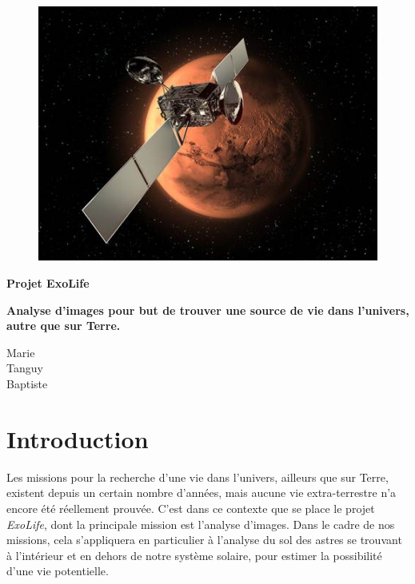 \documentclass[12pt]{article}
\begin{document}
\begin{figure}
	\centering
	\includegraphics[scale=0.8]{images/logo.jpg}
\end{figure}

\hspace{\fill}

\begin{center}
	\LARGE{\textbf{Projet ExoLife}}
\end{center}


\begin{center}
\textbf{Analyse d'images pour but de trouver une source de vie dans l'univers, autre que sur Terre.}\\
\end{center}

\vspace{\fill}

\begin{flushright}
	 Marie\\
	 Tanguy\\
	 Baptiste\\
\end{flushright}

\clearpage

\tableofcontents

\section{Introduction}

Les missions pour la recherche d’une vie dans l’univers, ailleurs que sur Terre, existent depuis un certain nombre d’années, mais aucune vie extra-terrestre n’a encore été réellement prouvée. C’est dans ce contexte que se place le projet \emph{ExoLife}, dont la principale mission est l’analyse d’images. Dans le cadre de nos missions, cela s’appliquera en particulier à l’analyse du sol des astres se trouvant à l’intérieur et en dehors de notre système solaire, pour estimer la possibilité d’une vie potentielle.
\end{document}
